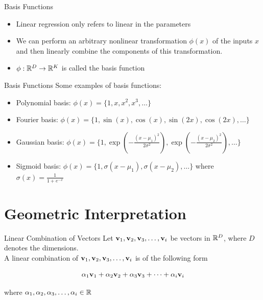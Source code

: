 \documentclass{beamer}
\begin{document}
\begin{frame}{Basis Functions}
    \begin{itemize}
        \item Linear regression only refers to linear in the parameters
        \item We can perform an arbitrary nonlinear transformation $\phi(x)$ of the inputs $x$ and then linearly combine the components of this transformation.
        \item $\phi: \mathbb{R}^D \rightarrow \mathbb{R}^K$ is called the basis function
    \end{itemize} 
    
\end{frame}

\begin{frame}{Basis Functions}
    Some examples of basis functions:
    \begin{itemize}
        \item Polynomial basis: $\phi(x) = \{1, x, x^2, x^3, \dots\}$
        \item Fourier basis: $\phi(x) = \{1, \sin(x), \cos(x), \sin(2x), \cos(2x), \dots\}$
        \item Gaussian basis: $\phi(x) = \{1, \exp(-\frac{(x-\mu_1)^2}{2\sigma^2}), \exp(-\frac{(x-\mu_2)^2}{2\sigma^2}), \dots\}$
        \item Sigmoid basis: $\phi(x) = \{1, \sigma(x-\mu_1), \sigma(x-\mu_2), \dots\}$ where $\sigma(x) = \frac{1}{1+e^{-x}}$
    \end{itemize}
    
    
\end{frame}

\section{Geometric Interpretation}
\begin{frame}{Linear Combination of Vectors}
    Let $\mathbf{v}_{1},\mathbf{v}_{2},\mathbf{v}_{3},\dots,\mathbf{v}_{i}$ be vectors in  $\mathbb{R}^{D}$, where $D$ denotes the dimensions. \pause \\A linear combination of $\mathbf{v}_{1},\mathbf{v}_{2},\mathbf{v}_{3},\dots,\mathbf{v}_{i}$ is of the following form
    
    \pause \begin{equation*}
        \alpha_{1}\mathbf{v}_{1}+			\alpha_{2}\mathbf{v}_{2}+			\alpha_{3}\mathbf{v}_{3}+
        \dots+\alpha_{i}\mathbf{v}_{i}
    \end{equation*}
    
    where $\alpha_{1},\alpha_{2},\alpha_{3},\dots,\alpha_{i} \in \mathbb{R}$
    
\end{frame}
\end{document}
